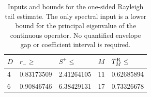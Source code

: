 \begin{table}[htbp]
\centering
\caption{Inputs and bounds for the one-sided Rayleigh tail estimate. The only spectral input is a lower bound for the principal eigenvalue of the continuous operator. No quantified envelope gap or coefficient interval is required.}
\label{tab:rayleigh_tails}
\begin{tabular}{lllll}
\toprule
$D$ & $r_-\geq$ & $S^+\leq$ & $M$ & $T_M^{\rm R}\leq$ \\
\midrule
4 & 0.83173509 & 2.41264105 & 11 & 0.62685894 \\
6 & 0.90846746 & 6.38429131 & 17 & 0.73326678 \\
\bottomrule
\end{tabular}
\end{table}
